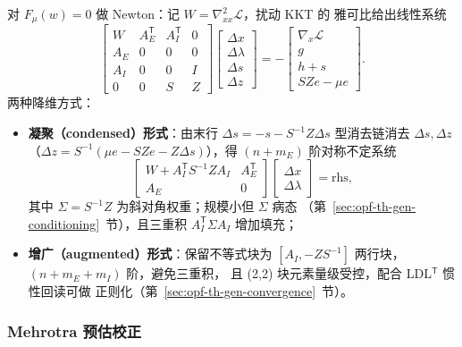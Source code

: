 对 $F_\mu(w)=0$ 做 Newton：记 $W=\nabla^2_{xx}\mathcal L$，扰动 KKT 的
雅可比给出线性系统
\begin{equation}
\begin{bmatrix}
W & A_E^{\mathsf T} & A_I^{\mathsf T} & 0\\
A_E & 0 & 0 & 0\\
A_I & 0 & 0 & I\\
0 & 0 & S & Z
\end{bmatrix}
\begin{bmatrix}\Delta x\\ \Delta\lambda\\ \Delta s\\ \Delta z\end{bmatrix}
=-
\begin{bmatrix}
\nabla_x\mathcal L\\ g\\ h+s\\ SZe-\mu e
\end{bmatrix}.
\label{eq:opf-th-gen-newton4}
\end{equation}
两种降维方式：
\begin{itemize}
  \item \textbf{凝聚（condensed）形式}：由末行 $\Delta s=-s-S^{-1}Z
        \Delta s$ 型消去链消去 $\Delta s,\Delta z$（$\Delta z=S^{-1}
        (\mu e-SZe-Z\Delta s)$），得 $(n+m_E)$ 阶对称不定系统
        \begin{equation}
        \begin{bmatrix}W+A_I^{\mathsf T}S^{-1}ZA_I&A_E^{\mathsf T}\\
        A_E&0\end{bmatrix}
        \begin{bmatrix}\Delta x\\ \Delta\lambda\end{bmatrix}=\text{rhs},
        \label{eq:opf-th-gen-condensed}
        \end{equation}
        其中 $\Sigma=S^{-1}Z$ 为斜对角权重；规模小但 $\Sigma$ 病态
        （第~\ref{sec:opf-th-gen-conditioning}~节），且三重积
        $A_I^{\mathsf T}\Sigma A_I$ 增加填充；
  \item \textbf{增广（augmented）形式}：保留不等式块为
        $[A_I, -ZS^{-1}]$ 两行块，$(n+m_E+m_I)$ 阶，避免三重积，
        且 (2,2) 块元素量级受控，配合 LDL$^{\mathsf T}$ 惯性回读可做
        正则化（第~\ref{sec:opf-th-gen-convergence}~节）。
\end{itemize}

\subsubsection{Mehrotra 预估校正}

